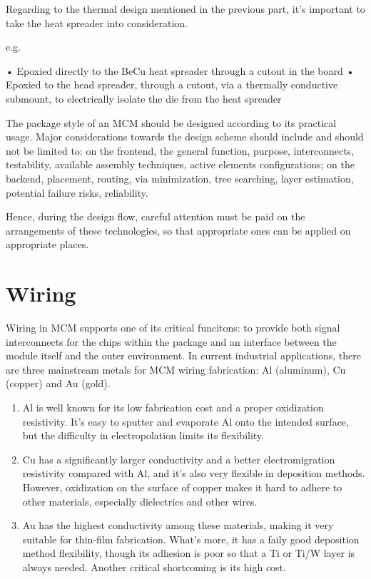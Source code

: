 \begin{spacing}{1.5}
Regarding to the thermal design mentioned in the previous part, it's important to take the heat spreader into consideration. 

e.g.

• Epoxied directly to the BeCu heat spreader through a cutout in the board
• Epoxied to the head spreader, through a cutout, via a thermally conductive submount, to electrically isolate the die from the heat spreader

The package style of an MCM should be designed according to its practical usage. Major considerations towards the design scheme should include and should not be limited to: on the frontend, the general function, purpose, interconnects, testability, available assembly techniques, active elements configurations; on the backend, placement, routing, via minimization, tree searching, layer estimation, potential failure risks, reliability. 

Hence, during the design flow, careful attention must be paid on the arrangements of these technologies, so that appropriate ones can be applied on appropriate places. \cite{chen2006vlsi} 

\section{Wiring}

Wiring in MCM supports one of its critical funcitons: to provide both signal interconnects for the chips within the package and an interface between the module itself and the outer environment. In current industrial applications, there are three mainstream metals for MCM wiring fabrication: Al (aluminum), Cu (copper) and Au (gold). 

\begin{enumerate}
    \item Al is well known for its low fabrication cost and a proper oxidization resistivity. It's easy to sputter and evaporate Al onto the intended surface, but the difficulty in electropolation limits its flexibility. 
    \item Cu has a significantly larger conductivity and a better electromigration resistivity compared with Al, and it's also very flexible in deposition methods. However, oxidization on the surface of copper makes it hard to adhere to other materials, especially dielectrics and other wires. 
    \item Au has the highest conductivity among these materials, making it very suitable for thin-film fabrication. What's more, it has a faily good deposition method flexibility, though its adhesion is poor so that a Ti or Ti/W layer is always needed. Another critical shortcoming is its high cost. 
\end{enumerate} 


\end{spacing}
